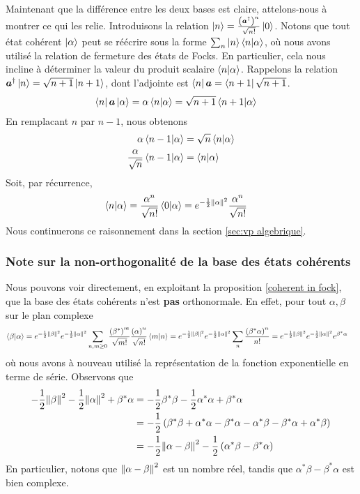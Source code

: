 \documentclass[11pt,oneside,a4paper]{article}
\begin{document}
Maintenant que la différence entre les deux bases est claire, attelons-nous à montrer ce qui les relie. Introduisons la relation $\ket{n} = \frac{\left(\bm{a}^\dagger\right)^n}{\sqrt{n!}}\ket{0}$. Notons que tout état cohérent $\ket{\alpha}$ peut se réécrire sous la forme $\sum_n \ket{n}\braket{n}{\alpha}$, où nous avons utilisé la relation de fermeture des états de Focks. En particulier, cela nous incline à déterminer la valeur du produit scalaire $\braket{n}{\alpha}$. Rappelons la relation $\bm{a}^\dagger\ket{n} = \sqrt{n+1}\ket{n+1}$, dont l'adjointe est $\bra{n}\bm{a} = \bra{n+1}\sqrt{n+1}$.
\begin{align}
  \bra{n}\bm{a}\ket{\alpha} = \alpha\braket{n}{\alpha} &= \sqrt{n+1}\braket{n+1}{\alpha}\notag
\end{align}
En remplacant $n$ par $n-1$, nous obtenons
\begin{align}
  \alpha\braket{n-1}{\alpha} &= \sqrt{n}\braket{n}{\alpha}\notag\\
  \frac{\alpha}{\sqrt{n}}\braket{n-1}{\alpha} &= \braket{n}{\alpha}\notag
\end{align}
Soit, par récurrence, 
\begin{align}
  \braket{n}{\alpha} &= \frac{\alpha^n}{\sqrt{n!}}\braket{0}{\alpha} = e^{-\frac{1}{2}\norm{\alpha}^2}\frac{\alpha^n}{\sqrt{n!}}\label{eq:scalar fock vs coherent}
\end{align}
Nous continuerons ce raisonnement dans la section \ref{sec:vp algebrique}.
\subsubsection{Note sur la non-orthogonalité de la base des états cohérents}
Nous pouvons voir directement, en exploitant la proposition \ref{coherent in fock}, que la base des états cohérents n'est \textbf{pas} orthonormale. En effet, pour tout $\alpha,\beta$ sur le plan complexe
\begin{align}
  \braket{\beta}{\alpha} &= e^{-\frac{1}{2}\norm{\beta}^2}e^{-\frac{1}{2}\norm{\alpha}^2}\sum_{n,m\geq 0}\frac{\left(\beta^*\right)^m}{\sqrt{m!}}\frac{\left(\alpha\right)^n}{\sqrt{n!}}\braket{m}{n}
  = e^{-\frac{1}{2}\norm{\beta}^2}e^{-\frac{1}{2}\norm{\alpha}^2} \sum_n \frac{\left(\beta^*\alpha\right)^n}{n!} = e^{-\frac{1}{2}\norm{\beta}^2}e^{-\frac{1}{2}\norm{\alpha}^2}e^{\beta^*\alpha}\label{15}
\end{align}
où nous avons à nouveau utilisé la représentation de la fonction exponentielle en terme de série. Observons que 
\begin{align*}
  -\frac{1}{2}\norm{\beta}^2-\frac{1}{2}\norm{\alpha}^2+\beta^*\alpha &= -\frac{1}{2}\beta^*\beta - \frac{1}{2}\alpha^*\alpha+\beta^*\alpha\\
  &= -\frac{1}{2}\left(\beta^*\beta+\alpha^*\alpha-\beta^*\alpha-\alpha^*\beta-\beta^*\alpha+\alpha^*\beta\right)\\
  &= -\frac{1}{2}\norm{\alpha-\beta}^2-\frac{1}{2}\left(\alpha^*\beta-\beta^*\alpha\right)
\end{align*}
En particulier, notons que $\norm{\alpha-\beta}^2$ est un nombre réel, tandis que $\alpha^*\beta-\beta^*\alpha$ est bien complexe. 
\end{document}
